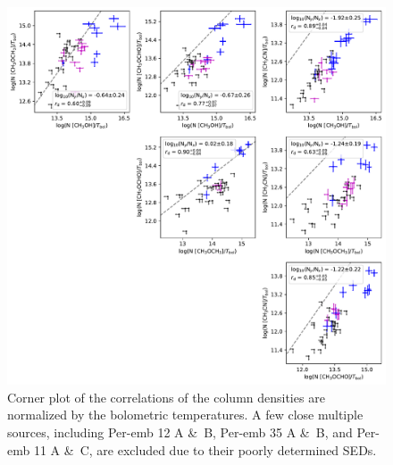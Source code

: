 \documentclass[twocolumn]{aastex62}
\begin{document}
\addtocounter{figure}{-1}
\begin{figure}[htbp!]
  \centering
  \includegraphics[width=\textwidth]{corner_Ncol_correlations_norm_Tbol.pdf}
  \caption{Corner plot of the correlations of the column densities are normalized by the bolometric temperatures.  A few close multiple sources, including Per-emb 12 A \&\ B, Per-emb 35 A \&\ B, and Per-emb 11 A \&\ C, are excluded due to their poorly determined SEDs.}
  \label{fig:corner_tbol}
\end{figure}
\end{document}
